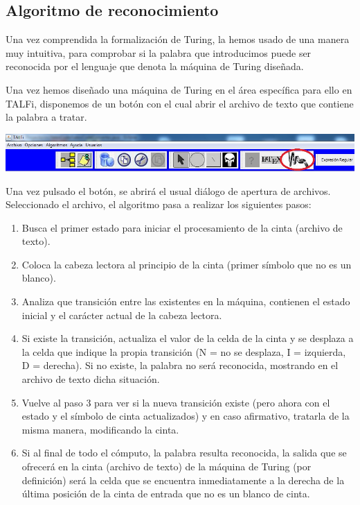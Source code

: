 \documentclass[12pt,a4paper,spanish]{book}
\begin{document}
\subsection{Algoritmo de reconocimiento}
Una vez comprendida la formalizaci\'on de Turing, la hemos usado de una manera muy intuitiva, para comprobar si la palabra que introducimos puede ser reconocida por el lenguaje que denota la m\'aquina de Turing dise\~nada.

Una vez hemos dise\~nado una m\'aquina de Turing en el \'area espec\'ifica para ello en TALFi, disponemos de un bot\'on con el cual abrir el archivo de texto que contiene la palabra a tratar.


\begin{center}
\includegraphics[width=\textwidth]{turi2.jpg}
\end{center}

Una vez pulsado el bot\'on, se abrir\'a el usual di\'alogo de apertura de archivos. Seleccionado el archivo, el algoritmo pasa a realizar los siguientes pasos:
\begin{enumerate}
\item Busca el primer estado para iniciar el procesamiento de la cinta (archivo de texto).
\item Coloca la cabeza lectora al principio de la cinta (primer s\'imbolo que no es un blanco).
\item Analiza que transici\'on entre las existentes en la m\'aquina, contienen el estado inicial y el car\'acter actual de la cabeza lectora.
\item Si existe la transici\'on, actualiza el valor de la celda de la cinta y se desplaza a la celda que indique la propia transici\'on (N =  no se desplaza, I = izquierda, D = derecha). Si no existe, la palabra no ser\'a reconocida, mostrando en el archivo de texto dicha situaci\'on.
\item Vuelve al paso 3 para ver si la nueva transici\'on existe (pero ahora con el estado y el s\'imbolo de cinta actualizados) y en caso afirmativo, tratarla de la misma manera, modificando la cinta.
\item Si al final de todo el c\'omputo, la palabra resulta reconocida, la salida que se ofrecer\'a en la cinta (archivo de texto) de la m\'aquina de Turing (por definici\'on) ser\'a la celda que se encuentra inmediatamente a la derecha de la \'ultima posici\'on de la cinta de entrada que no es un blanco de cinta.
\end{enumerate}
\end{document}
